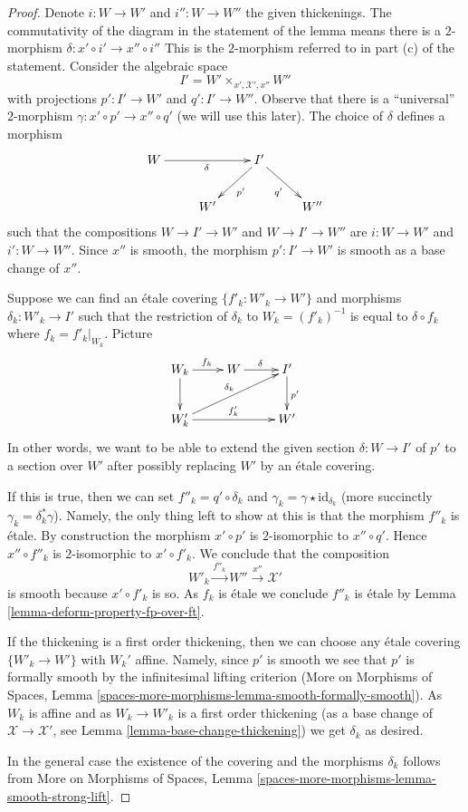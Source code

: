 \documentclass[10pt,a4paper]{amsart}
\theoremstyle{plain}
\theoremstyle{definition}
\theoremstyle{remark}
\numberwithin{equation}{subsection}
\begin{document}
\begin{proof}
Denote $i : W \to W'$ and $i'' : W \to W''$ the given thickenings.
The commutativity of the diagram in the statement of the lemma
means there is a $2$-morphism $\delta : x' \circ i' \to x'' \circ i''$
This is the $2$-morphism referred to in part (c) of the statement.
Consider the algebraic space
$$
I' = W' \times_{x', \mathcal{X}', x''} W''
$$
with projections $p' : I' \to W'$ and $q' : I' \to W''$.
Observe that there is a ``universal'' $2$-morphism
$\gamma : x' \circ p' \to x'' \circ q'$ (we will use this later).
The choice of $\delta$ defines a morphism
$$
\xymatrix{
W \ar[rr]_\delta & & I' \ar[ld]^{p'} \ar[rd]_{q'} \\
& W' & & W''
}
$$
such that the compositions $W \to I' \to W'$ and $W \to I' \to W''$
are $i : W \to W'$ and $i' : W \to W''$.
Since $x''$ is smooth, the morphism $p' : I' \to W'$ is smooth
as a base change of $x''$.

\medskip\noindent
Suppose we can find an \'etale covering $\{f'_k : W'_k \to W'\}$
and morphisms $\delta_k : W'_k \to I'$ such that the restriction
of $\delta_k$ to $W_k = (f'_k)^{-1}$ is equal to $\delta \circ f_k$
where $f_k = f'_k|_{W_k}$. Picture
$$
\xymatrix{
W_k \ar[r]^{f_k} \ar[d] & W \ar[r]^\delta & I' \ar[d]^{p'} \\
W'_k \ar[rr]^{f'_k} \ar[rru]^{\delta_k} & & W'
}
$$
In other words, we want to be able to extend the given section
$\delta : W \to I'$ of $p'$ to a section over $W'$ after possibly
replacing $W'$ by an \'etale covering.

\medskip\noindent
If this is true, then we can set $f''_k = q' \circ \delta_k$
and $\gamma_k = \gamma \star \text{id}_{\delta_k}$ (more succinctly
$\gamma_k = \delta_k^*\gamma$). Namely, the only thing left to show
at this is that the morphism $f''_k$ is \'etale.
By construction the morphism $x' \circ p'$ is $2$-isomorphic
to $x'' \circ q'$. Hence $x'' \circ f''_k$ is $2$-isomorphic
to $x' \circ f'_k$. We conclude that the composition
$$
W'_k \xrightarrow{f''_k} W'' \xrightarrow{x''} \mathcal{X}'
$$
is smooth because $x' \circ f'_k$ is so.
As $f_k$ is \'etale we conclude $f''_k$ is \'etale
by Lemma \ref{lemma-deform-property-fp-over-ft}.

\medskip\noindent
If the thickening is a first order thickening, then we can
choose any \'etale covering $\{W'_k \to W'\}$ with $W_k'$ affine.
Namely, since $p'$ is smooth we see that $p'$ is formally smooth by the
infinitesimal lifting criterion (More on Morphisms of Spaces, Lemma
\ref{spaces-more-morphisms-lemma-smooth-formally-smooth}).
As $W_k$ is affine and as $W_k \to W'_k$ is a first order thickening
(as a base change of $\mathcal{X} \to \mathcal{X}'$, see
Lemma \ref{lemma-base-change-thickening}) we get $\delta_k$ as
desired.

\medskip\noindent
In the general case the existence of the covering and the morphisms
$\delta_k$ follows from More on Morphisms of Spaces, Lemma
\ref{spaces-more-morphisms-lemma-smooth-strong-lift}.
\end{proof}
\end{document}
